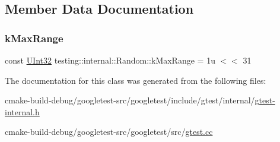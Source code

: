 \subsection{Member Data Documentation}
\mbox{\label{classtesting_1_1internal_1_1Random_a36d72dd7063d0b5338f229e75382fdd2}} 
\subsubsection{\texorpdfstring{kMaxRange}{kMaxRange}}
{\footnotesize\ttfamily const \mbox{\hyperlink{namespacetesting_1_1internal_a40d4fffcd2bf56f18b1c380615aa85e3}{U\+Int32}} testing\+::internal\+::\+Random\+::k\+Max\+Range = 1u $<$$<$ 31\hspace{0.3cm}{\ttfamily [static]}}



The documentation for this class was generated from the following files\+:\begin{DoxyCompactItemize}
\item 
cmake-\/build-\/debug/googletest-\/src/googletest/include/gtest/internal/\mbox{\hyperlink{gtest-internal_8h}{gtest-\/internal.\+h}}\item 
cmake-\/build-\/debug/googletest-\/src/googletest/src/\mbox{\hyperlink{gtest_8cc}{gtest.\+cc}}\end{DoxyCompactItemize}
